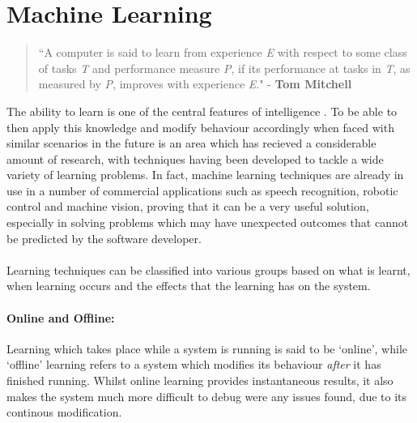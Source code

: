 \documentclass[a4paper,oneside]{report}
\begin{document}
\section{Machine Learning}

\begin{quotation}``A computer is said to learn from experience \emph{E} with respect to some class of tasks \emph{T} and performance measure \emph{P}, if its performance at tasks in \emph{T}, as measured by \emph{P}, improves with experience \emph{E}." - \textbf{Tom Mitchell} \cite{mitchell1997machine} 
\end{quotation}

The ability to learn is one of the central features of intelligence \cite{Langley:1996zr}. To be able to then apply this knowledge and modify behaviour accordingly when faced with similar scenarios in the future is an area which has recieved a considerable amount of research, with techniques having been developed to tackle a wide variety of learning problems. In fact, machine learning techniques are already in use in a number of commercial applications such as speech recognition, robotic control and machine vision, proving that it can be a very useful solution, especially in solving problems which may have unexpected outcomes that cannot be predicted by the software developer.

\paragraph{} Learning techniques can be classified into various groups based on what is learnt, when learning occurs and the effects that the learning has on the system. 

\paragraph{Online and Offline:} Learning which takes place while a system is running is said to be `online', while `offline' learning refers to a system which modifies its behaviour \emph{after} it has finished running. Whilst online learning provides instantaneous results, it also makes the system much more difficult to debug were any issues found, due to its continous modification.
\end{document}
